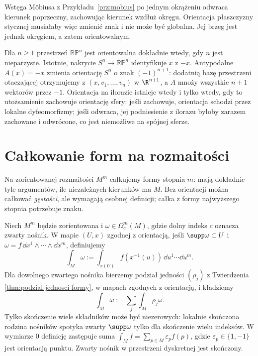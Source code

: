 \begin{przyklad}
Wstęga Möbiusa z Przykładu~\ref{prz:mobius}
po jednym okrążeniu odwraca
kierunek poprzeczny, zachowując kierunek
wzdłuż okręgu. Orientacja płaszczyzny stycznej
musiałaby więc zmienić znak i nie może być globalna.
Jej brzeg jest jednak okręgiem, a zatem orientowalnym.

Dla $n\geq1$ przestrzeń $\mathbb{RP}^n$ jest
orientowalna dokładnie wtedy, gdy $n$ jest nieparzyste.
Istotnie, nakrycie $S^n\to\mathbb{RP}^n$ identyfikuje
$x$ z $-x$. Antypodalne $A(x)=-x$ zmienia orientację
$S^n$ o znak $(-1)^{n+1}$: dodatnią bazę przestrzeni otaczającej
otrzymujemy z $(x,v_1,\ldots,v_n)$ w $\R^{n+1}$,
a $A$ mnoży wszystkie $n+1$ wektorów przez $-1$.
Orientacja na ilorazie istnieje wtedy i tylko wtedy,
gdy to utożsamienie zachowuje orientację sfery:
jeśli zachowuje, orientacja schodzi przez lokalne
dyfeomorfizmy; jeśli odwraca, jej podniesienie z
ilorazu byłoby zarazem zachowane i odwrócone, co
jest niemożliwe na spójnej sferze.
\end{przyklad}
\section{Całkowanie form na rozmaitości}
\label{sec:formy-calkowanie}

Na zorientowanej rozmaitości $M^m$ całkujemy formy
stopnia $m$: mają dokładnie tyle argumentów, ile
niezależnych kierunków ma $M$. Bez orientacji można
całkować \emph{gęstości}, ale wymagają osobnej definicji;
całka z formy najwyższego stopnia potrzebuje znaku.

\begin{definicja}
\label{def:calka-z-formy}
Niech $M^m$ będzie zorientowana i
$\omega\in\Omega_c^m(M)$, gdzie dolny indeks $c$
oznacza zwarty nośnik. W mapie $(U,x)$ zgodnej z
orientacją, jeśli $\supp\omega\subset U$ i
$\omega=f\,\dd x^1\wedge\cdots\wedge\dd x^m$,
definiujemy
\begin{equation}\label{eq:calka-lokalna}
 \int_M\omega:=\int_{x(U)} f(x^{-1}(u))\,\dd u^1\cdots\dd u^m.
\end{equation}
Dla dowolnego zwartego nośnika bierzemy podział
jedności $(\rho_j)$ z Twierdzenia
\ref{thm:podzial-jednosci-formy}, w mapach zgodnych
z orientacją, i kładziemy
\begin{equation}\label{eq:calka-globalna}
 \int_M\omega:=\sum_j\int_M\rho_j\omega.
\end{equation}
Tylko skończenie wiele składników może być niezerowych:
lokalnie skończona rodzina nośników spotyka zwarty
$\supp\omega$ tylko dla skończenie wielu indeksów.
W wymiarze $0$ definicję zastępuje suma
$\int_M f=\sum_{p\in M}\varepsilon_p f(p)$,
gdzie $\varepsilon_p\in\{1,-1\}$ jest orientacją punktu.
Zwarty nośnik w przestrzeni dyskretnej jest skończony.
\end{definicja}

